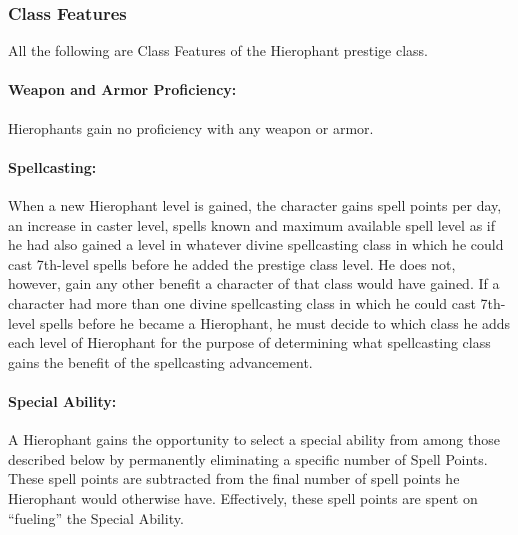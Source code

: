 \subsubsection{Class Features}
All the following are Class Features of the Hierophant prestige class.

\paragraph{Weapon and Armor Proficiency:} Hierophants gain no proficiency with any weapon or armor.

\paragraph{Spellcasting:} When a new Hierophant level is gained, the character gains spell points per day, an increase in caster level, spells known and maximum available spell level as if he had also gained a level in whatever divine spellcasting class in which he could cast 7th-level spells before he added the prestige class level. 
He does not, however, gain any other benefit a character of that class would have gained. 
If a character had more than one divine spellcasting class in which he could cast 7th-level spells before he became a Hierophant, he must decide to which class he adds each level of Hierophant for the purpose of determining what spellcasting class gains the benefit of the spellcasting advancement.

\paragraph{Special Ability:}
A Hierophant gains the opportunity to select a special ability from among those described below by permanently eliminating a specific number of Spell Points.
These spell points are subtracted from the final number of spell points he Hierophant would otherwise have.
Effectively, these spell points are spent on ``fueling'' the Special Ability.

